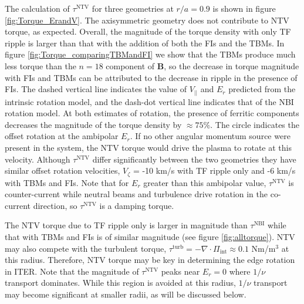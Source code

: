 \documentclass[aip, pop, preprint]{revtex4-1}
\numberwithin{figure}{section}
\numberwithin{equation}{section}
\begin{document}
The calculation of $\tau^{\text{NTV}}$ for three geometries at $r/a = 0.9$ is shown in figure \ref{fig:Torque_ErandV}. The axisymmetric geometry does not contribute to NTV torque, as expected. Overall, the magnitude of the torque density with only TF ripple is larger than that with the addition of both the FIs and the TBMs.  In figure \ref{fig:Torque_comparingTBMandFI} we show that the TBMs produce much less torque than the $n = 18$ component of $\bm{B}$, so the decrease in torque magnitude with FIs and TBMs can be attributed to the decrease in ripple in the presence of FIs. The dashed vertical line indicates the value of $V_{||}$ and $E_r$ predicted from the intrinsic rotation model, and the dash-dot vertical line indicates that of the NBI rotation model. At both estimates of rotation, the presence of ferritic components decreases the magnitude of the torque density by $\approx 75\%$. The circle indicates the offset rotation at the ambipolar $E_r$. If no other angular momentum source were present in the system, the NTV torque would drive the plasma to rotate at this velocity. Although $\tau^{\text{NTV}}$ differ significantly between the two geometries they have similar offset rotation velocities, $V_{\zeta}$ = -10 km/s with TF ripple only and -6 km/s with TBMs and FIs. Note that for $E_r$ greater than this ambipolar value, $\tau^{\text{NTV}}$ is counter-current while neutral beams and turbulence drive rotation in the co-current direction, so $\tau^{\text{NTV}}$ is a damping torque. 

The NTV torque due to TF ripple only is larger in magnitude than $\tau^{\text{NBI}}$ while that with TBMs and FIs is of similar magnitude (see figure \ref{fig:alltorque}). NTV may also compete with the turbulent torque, $\tau^{\text{turb}} = - \nabla \cdot \Pi_{\text{int}} \approx 0.1$ Nm/m$^3$ at this radius. Therefore, NTV torque may be key in determining the edge rotation in ITER. Note that the magnitude of $\tau^{\text{NTV}}$ peaks near $E_r = 0$ where $1/\nu$ transport dominates. While this region is avoided at this radius, $1/\nu$ transport may become significant at smaller radii, as will be discussed below. 

\FloatBarrier
\end{document}
